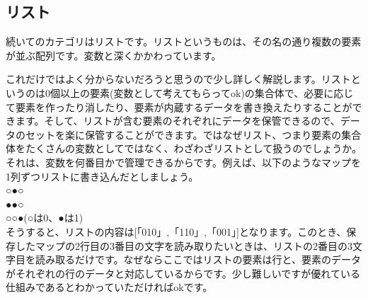 \documentclass[b5paper,10pt]{jsarticle}
\begin{document}
\begin{multicols*}{3}
\subsection{リスト}
続いてのカテゴリはリストです。リストというものは、その名の通り複数の要素が並ぶ配列です。変数と深くかかわっています。

これだけではよく分からないだろうと思うので少し詳しく解説します。リストというのは0個以上の要素(変数として考えてもらってok)の集合体で、必要に応じて要素を作ったり消したり、要素が内蔵するデータを書き換えたりすることができます。そして、リストが含む要素のそれぞれにデータを保管できるので、データのセットを楽に保管することができます。ではなぜリスト、つまり要素の集合体をたくさんの変数としてではなく、わざわざリストとして扱うのでしょうか。それは、変数を何番目かで管理できるからです。例えば、以下のようなマップを1列ずつリストに書き込んだとしましょう。\\
○●○\\
●●○\\
○○●(○は0、●は1)\\
そうすると、リストの内容は[「010」,「110」,「001」]となります。このとき、保存したマップの2行目の3番目の文字を読み取りたいときは、リストの2番目の3文字目を読み取るだけです。なぜならここではリストの要素は行と、要素のデータがそれぞれの行のデータと対応しているからです。少し難しいですが優れている仕組みであるとわかっていただければokです。


\end{multicols*}
\end{document}
